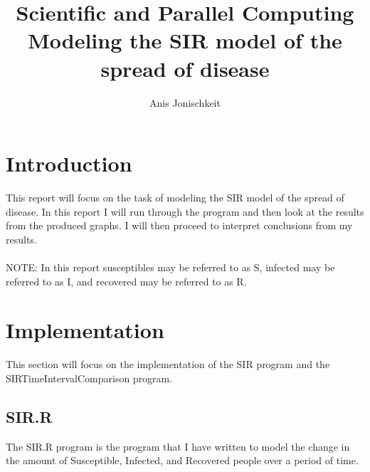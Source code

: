 \documentclass{article}
\begin{document}
\title{Scientific and Parallel Computing \\ Modeling the SIR model of the spread of disease}
\author{Anis Jonischkeit}

\maketitle

\section{Introduction}
    This report will focus on the task of modeling the SIR model of the spread of disease. In this report I will run through the program and then look at the results from the produced graphs. I will then proceed to interpret conclusions from my results.
    \\
    \\
    NOTE: In this report susceptibles may be referred to as S, infected may be referred to as I, and recovered may be referred to as R.

\section{Implementation}
    This section will focus on the implementation of the SIR program and the SIR\textunderscore Time\textunderscore Interval\textunderscore Comparison program.

    \subsection{SIR.R}
        The SIR.R program is the program that I have written to model the change in the amount of Susceptible, Infected, and Recovered people over a period of time.
\end{document}
